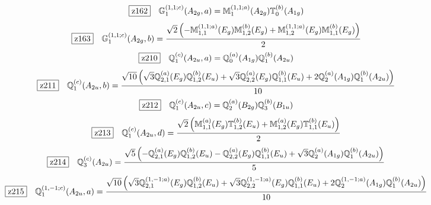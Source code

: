 \documentclass[fleqn,10pt,landscape]{jsarticle}
\begin{document}
\begin{dmath*}
\hspace*{3mm}\fbox{z162}\quad \mathbb{G}_{1}^{(1,1;c)}(A_{2g},a)=\mathbb{M}_{1}^{(1,1;a)}(A_{2g}) \mathbb{T}_{0}^{(b)}(A_{1g})
\end{dmath*}
\begin{dmath*}
\hspace*{3mm}\fbox{z163}\quad \mathbb{G}_{1}^{(1,1;c)}(A_{2g},b)=\frac{\sqrt{2} \left(- \mathbb{M}_{1,1}^{(1,1;a)}(E_{g}) \mathbb{M}_{1,2}^{(b)}(E_{g}) + \mathbb{M}_{1,2}^{(1,1;a)}(E_{g}) \mathbb{M}_{1,1}^{(b)}(E_{g})\right)}{2}
\end{dmath*}
\begin{dmath*}
\hspace*{3mm}\fbox{z210}\quad \mathbb{Q}_{1}^{(c)}(A_{2u},a)=\mathbb{Q}_{0}^{(a)}(A_{1g}) \mathbb{Q}_{1}^{(b)}(A_{2u})
\end{dmath*}
\begin{dmath*}
\hspace*{3mm}\fbox{z211}\quad \mathbb{Q}_{1}^{(c)}(A_{2u},b)=\frac{\sqrt{10} \left(\sqrt{3} \mathbb{Q}_{2,1}^{(a)}(E_{g}) \mathbb{Q}_{1,2}^{(b)}(E_{u}) + \sqrt{3} \mathbb{Q}_{2,2}^{(a)}(E_{g}) \mathbb{Q}_{1,1}^{(b)}(E_{u}) + 2 \mathbb{Q}_{2}^{(a)}(A_{1g}) \mathbb{Q}_{1}^{(b)}(A_{2u})\right)}{10}
\end{dmath*}
\begin{dmath*}
\hspace*{3mm}\fbox{z212}\quad \mathbb{Q}_{1}^{(c)}(A_{2u},c)=\mathbb{Q}_{2}^{(a)}(B_{2g}) \mathbb{Q}_{3}^{(b)}(B_{1u})
\end{dmath*}
\begin{dmath*}
\hspace*{3mm}\fbox{z213}\quad \mathbb{Q}_{1}^{(c)}(A_{2u},d)=\frac{\sqrt{2} \left(\mathbb{M}_{1,1}^{(a)}(E_{g}) \mathbb{T}_{1,2}^{(b)}(E_{u}) + \mathbb{M}_{1,2}^{(a)}(E_{g}) \mathbb{T}_{1,1}^{(b)}(E_{u})\right)}{2}
\end{dmath*}
\begin{dmath*}
\hspace*{3mm}\fbox{z214}\quad \mathbb{Q}_{3}^{(c)}(A_{2u})=\frac{\sqrt{5} \left(- \mathbb{Q}_{2,1}^{(a)}(E_{g}) \mathbb{Q}_{1,2}^{(b)}(E_{u}) - \mathbb{Q}_{2,2}^{(a)}(E_{g}) \mathbb{Q}_{1,1}^{(b)}(E_{u}) + \sqrt{3} \mathbb{Q}_{2}^{(a)}(A_{1g}) \mathbb{Q}_{1}^{(b)}(A_{2u})\right)}{5}
\end{dmath*}
\begin{dmath*}
\hspace*{3mm}\fbox{z215}\quad \mathbb{Q}_{1}^{(1,-1;c)}(A_{2u},a)=\frac{\sqrt{10} \left(\sqrt{3} \mathbb{Q}_{2,1}^{(1,-1;a)}(E_{g}) \mathbb{Q}_{1,2}^{(b)}(E_{u}) + \sqrt{3} \mathbb{Q}_{2,2}^{(1,-1;a)}(E_{g}) \mathbb{Q}_{1,1}^{(b)}(E_{u}) + 2 \mathbb{Q}_{2}^{(1,-1;a)}(A_{1g}) \mathbb{Q}_{1}^{(b)}(A_{2u})\right)}{10}
\end{dmath*}
\end{document}
